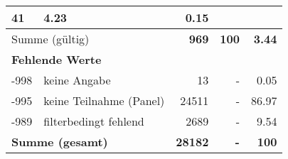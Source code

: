 \begin{longtable}{lXrrr}
       \num{41} &
       \num[round-mode=places,round-precision=2]{4.23} &
         \num[round-mode=places,round-precision=2]{0.15} \\
     \midrule
     \multicolumn{2}{l}{Summe (gültig)} &
       \textbf{\num{969}} &
     \textbf{100} &
       \textbf{\num[round-mode=places,round-precision=2]{3.44}} \\
     \multicolumn{5}{l}{\textbf{Fehlende Werte}}\\
       -998 &
       keine Angabe &
         \num{13} &
        - &
         \num[round-mode=places,round-precision=2]{0.05} \\
       -995 &
       keine Teilnahme (Panel) &
         \num{24511} &
        - &
         \num[round-mode=places,round-precision=2]{86.97} \\
       -989 &
       filterbedingt fehlend &
         \num{2689} &
        - &
         \num[round-mode=places,round-precision=2]{9.54} \\
     \midrule
     \multicolumn{2}{l}{\textbf{Summe (gesamt)}} &
          \textbf{\num{28182}} &
        \textbf{-} &
        \textbf{100} \\
     \bottomrule
     \end{longtable}
     
